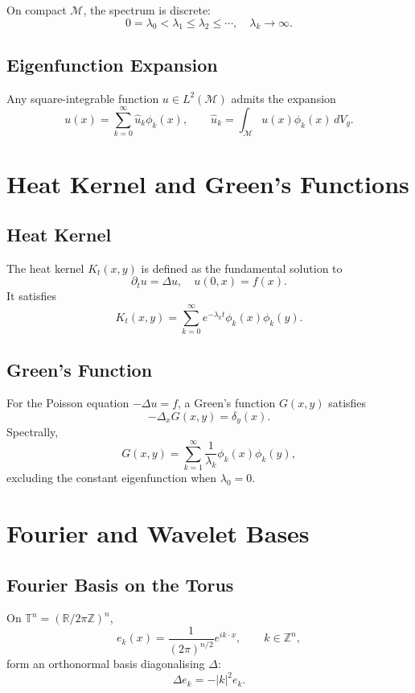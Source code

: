 On compact $\mathcal{M}$, the spectrum is discrete:
\[
0 = \lambda_0 < \lambda_1 \le \lambda_2 \le \cdots,\quad \lambda_k\to\infty.
\]

\subsection{Eigenfunction Expansion}

Any square-integrable function $u\in L^2(\mathcal{M})$ admits the expansion
\[
u(x)
  = \sum_{k=0}^\infty \hat{u}_k \phi_k(x),
\qquad
\hat{u}_k = \int_{\mathcal{M}} u(x)\phi_k(x)\, dV_g.
\]

\section{Heat Kernel and Green's Functions}

\subsection{Heat Kernel}

The heat kernel $K_t(x,y)$ is defined as the fundamental solution to
\[
\partial_t u = \Delta u,
\quad
u(0,x) = f(x).
\]
It satisfies
\[
K_t(x,y)
 = \sum_{k=0}^\infty e^{-\lambda_k t} \phi_k(x)\phi_k(y).
\]

\subsection{Green's Function}

For the Poisson equation $-\Delta u = f$, a Green's function $G(x,y)$ satisfies
\[
-\Delta_x G(x,y) = \delta_y(x).
\]
Spectrally,
\[
G(x,y)
  = \sum_{k=1}^\infty \frac{1}{\lambda_k} \phi_k(x)\phi_k(y),
\]
excluding the constant eigenfunction when $\lambda_0=0$.

\section{Fourier and Wavelet Bases}

\subsection{Fourier Basis on the Torus}

On $\mathbb{T}^n = (\mathbb{R}/2\pi\mathbb{Z})^n$,
\[
e_k(x) = \frac{1}{(2\pi)^{n/2}} e^{i k\cdot x},
\qquad k\in\mathbb{Z}^n,
\]
form an orthonormal basis diagonalising $\Delta$:
\[
\Delta e_k = -|k|^2 e_k.
\]

